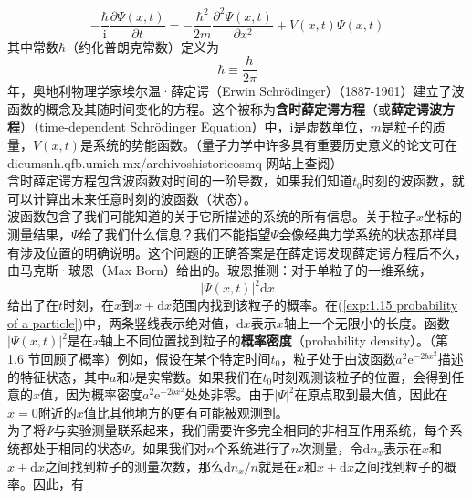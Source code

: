 	\begin{equation}
		-\frac{\hbar}{\mathrm{i}}\frac{\partial \Psi \left(x,t\right)}{\partial t}= -\frac{\hbar^2}{2m}\frac{\partial^2 \Psi \left(x,t\right)}{\partial x^2}+ V\left(x,t\right)\Psi\left(x,t\right)
		\label{eq:1.13 Time-dependent Schödinger equation}
	\end{equation}
	其中常数$\hbar$（约化普朗克常数）定义为
	\begin{equation}
		\boxed{\hbar \equiv \frac{h}{2 \pi}}
		\label{eq:1.14 h-bar's definition}
	\end{equation}
	 年，奥地利物理学家埃尔温·薛定谔（Erwin Schrödinger）（1887-1961）建立了波函数的概念及其随时间变化的方程。这个被称为\textbf{含时薛定谔方程}（或\textbf{薛定谔波方程}）（time-dependent Schrödinger Equation）中，$\mathrm{i}$是虚数单位，$m$是粒子的质量，$V\left(x,t\right)$是系统的势能函数。（量子力学中许多具有重要历史意义的论文可在 dieumsnh.qfb.umich.mx/archivoshistoricosmq 网站上查阅）\\
	\indent 含时薛定谔方程包含波函数对时间的一阶导数，如果我们知道$t_0$时刻的波函数，就可以计算出未来任意时刻的波函数（状态）。\\
	\indent 波函数包含了我们可能知道的关于它所描述的系统的所有信息。关于粒子$x$坐标的测量结果，$\Psi$给了我们什么信息？我们不能指望$\Psi$会像经典力学系统的状态那样具有涉及位置的明确说明。这个问题的正确答案是在薛定谔发现薛定谔方程后不久，由马克斯·玻恩（Max Born）给出的。玻恩推测：对于单粒子的一维系统，
	\begin{equation}
		\left|\Psi \left(x,t\right)\right|^2 \mathrm{d}x
		\label{exp:1.15 probability of a particle}
	\end{equation}
	给出了在$t$时刻，在$x$到$x+ \mathrm{d}x$范围内找到该粒子的概率。在(\ref{exp:1.15 probability of a particle})中，两条竖线表示绝对值，$\mathrm{d}x$表示$x$轴上一个无限小的长度。函数$\left|\Psi \left(x,t\right)\right|^2$是在$x$轴上不同位置找到粒子的\textbf{概率密度}（probability density）。（第 1.6 节回顾了概率）例如，假设在某个特定时间$t_0$，粒子处于由波函数$a^2\mathrm{e}^{-2bx^2}$描述的特征状态，其中$a$和$b$是实常数。如果我们在$t_0$时刻观测该粒子的位置，会得到任意的$x$值，因为概率密度$a^2\mathrm{e}^{-2bx^2}$处处非零。由于$\left|\Psi\right|^2$在原点取到最大值，因此在$x=0$附近的$x$值比其他地方的更有可能被观测到。\\
	\indent 为了将$\Psi$与实验测量联系起来，我们需要许多完全相同的非相互作用系统，每个系统都处于相同的状态$\Psi$。如果我们对$n$个系统进行了$n$次测量，令$\mathrm{d}n_x$表示在$x$和$x+\mathrm{d}x$之间找到粒子的测量次数，那么$\mathrm{d}n_x/n$就是在$x$和$x+\mathrm{d}x$之间找到粒子的概率。因此，有

